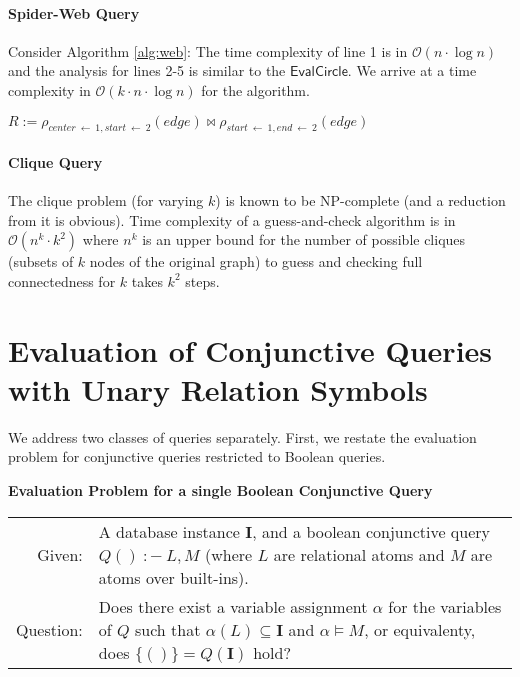 \documentclass[a4paper,12pt]{article}
\newcommand{\dbi}{\ensuremath{\mathbf{I}}}
\newcommand{\bigo}{\ensuremath{\mathcal{O}}}
\newcommand{\query}[3]{\ensuremath{{#1}({#2})\:{:}{-}\:{#3}}}
\begin{document}
\paragraph{Spider-Web Query}{
Consider Algorithm \ref{alg:web}: The time complexity of line 1 is in $\bigo(n \cdot \log n)$ and the analysis for lines 2-5 is similar to the $\mathsf{EvalCircle}$. We arrive at a time complexity in $\bigo(k \cdot n \cdot \log n)$ for the algorithm.
\begin{algorithm}
	$R := \rho_{center \: \leftarrow\: 1, start\: \leftarrow\: 2}(edge) \bowtie \rho_{start\: \leftarrow\: 1, end\: \leftarrow\: 2}(edge)$\\
	\caption{$\mathsf{EvalSpiderWeb}(k)$}
	\label{alg:web}
\end{algorithm}
}

\paragraph{Clique Query}{The clique problem (for varying $k$) is known to be NP-complete (and a reduction from it is obvious). Time complexity of a guess-and-check algorithm is in $\bigo(n^k \cdot k^2)$ where $n^k$ is an upper bound for the number of possible cliques (subsets of $k$ nodes of the original graph) to guess and checking full connectedness for $k$ takes $k^2$ steps.}

\section{Evaluation of Conjunctive Queries with Unary Relation Symbols}

We address two classes of queries separately. First, we restate the evaluation problem for conjunctive queries restricted to Boolean queries.

\begin{center}
\textbf{Evaluation Problem for a single Boolean Conjunctive Query}\\[1mm]
\begin{tabular}{rp{14cm}}
Given: & A database instance $\dbi$, and a boolean conjunctive query $\query{Q}{}{L, M}$ (where $L$ are relational atoms and $M$ are atoms over built-ins). \\
Question: & Does there exist a variable assignment $\alpha$ for the variables of $Q$ such that $\alpha(L) \subseteq \dbi$ and $\alpha \models M$, or equivalenty, does  $\{()\} = Q(\dbi)$ hold?
\end{tabular}
\end{center}
\end{document}
